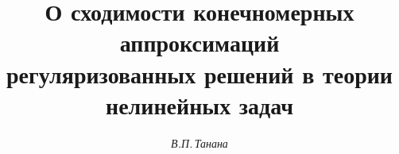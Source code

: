 

 




 


\newcommand{\myfont}{\series{m}\shape{n}\selectfont} 


\newcommand{\tts}[1]{} 


 




  


\setcounter{page}{66} 












\author{\it В.П.\,Танана} 




\title{О сходимости конечномерных аппроксимаций\\ 


регуляризованных решений в теории нелинейных задач} 


 


\date{} 




 


\pagestyle{plain} %


 


 




